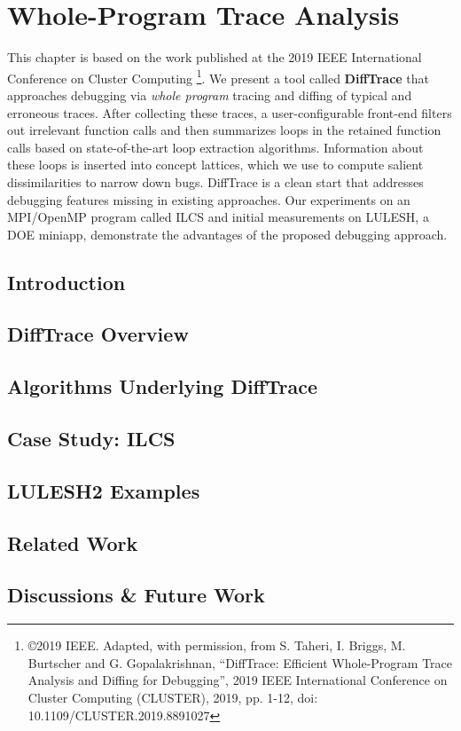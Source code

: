 
\chapter{Whole-Program Trace Analysis}
\label{sec:ch3}

This chapter is based on the work published at the 2019 IEEE International Conference on Cluster Computing \cite{diffTrace}\footnote{\copyright 2019 IEEE. Adapted, with permission, from S. Taheri, I. Briggs, M. Burtscher and G. Gopalakrishnan, ``DiffTrace: Efficient Whole-Program Trace Analysis and Diffing for Debugging'', 2019 IEEE International Conference on Cluster Computing (CLUSTER), 2019, pp. 1-12, doi: 10.1109/CLUSTER.2019.8891027}.
%
We present a tool called \textbf{DiffTrace} that approaches debugging via {\em whole program} tracing and
diffing of typical and erroneous traces.
%
After collecting these traces, a user-configurable front-end filters out irrelevant function calls and then summarizes loops in the retained function calls based on state-of-the-art loop extraction algorithms.
%
Information about these loops is inserted into concept lattices, which we use to compute salient dissimilarities to narrow down bugs.
%
DiffTrace is a clean start that addresses debugging features missing in existing approaches.
%
Our experiments on an MPI/OpenMP program called ILCS and initial measurements on LULESH, a DOE miniapp, demonstrate the advantages of the proposed debugging approach.

\section{Introduction}
\label{sec:ch3_intro}



\section{DiffTrace Overview}
\label{sec:ch3_overview}


\section{Algorithms Underlying DiffTrace}
\label{sec:ch3_algo}


\section{Case Study: ILCS}
\label{sec:ch3_ilcs-case-study}

%

\section{LULESH2 Examples}
\label{sec:ch3_lulesh}


\section{Related Work}
\label{sec:ch3_related}


\section{Discussions \& Future Work}
\label{sec:ch3_discussion}

